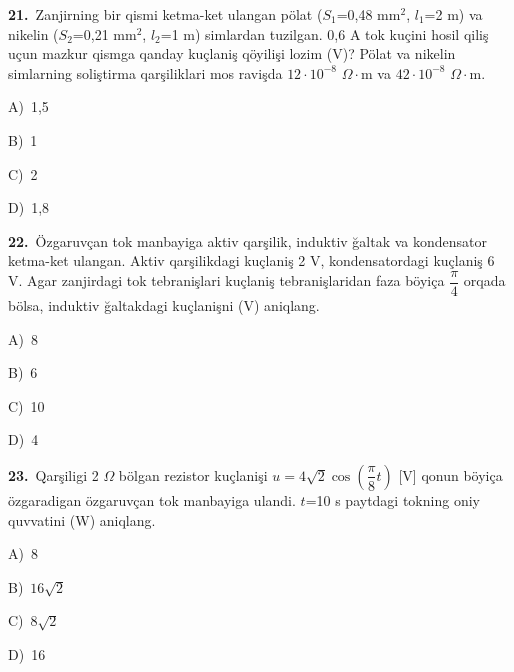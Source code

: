 \documentclass[11pt,a4paper]{article}
\newcommand{\opt}[2]{\hspace*{4mm}#1)\ #2\par}
\begin{document}
\noindent\begin{minipage}{\linewidth}
\textbf{21.}\ Zanjirning bir qismi ketma-ket ulangan pölat ($S_1$=0,48 mm$^{2}$, $l_1$=2 m) va nikelin ($S_2$=0,21 mm$^{2}$, $l_2$=1 m) simlardan tuzilgan. 0,6 A tok kuçini hosil qiliş uçun mazkur qismga qanday kuçlaniş qöyilişi lozim (V)? Pölat va nikelin simlarning soliştirma qarşiliklari mos ravişda $12\cdot10^{-8}$ $\Omega\cdot$m va $42\cdot10^{-8}$ $\Omega\cdot$m.\par\smallskip
\opt{A}{1,5}
\opt{B}{1}
\opt{C}{2}
\opt{D}{1,8}
\end{minipage}\vspace{9pt}\par
\noindent\begin{minipage}{\linewidth}
\textbf{22.}\ Özgaruvçan tok manbayiga aktiv qarşilik, induktiv ğaltak va kondensator ketma-ket ulangan. Aktiv qarşilikdagi kuçlaniş 2 V, kondensatordagi kuçlaniş 6 V. Agar zanjirdagi tok tebranişlari kuçlaniş tebranişlaridan faza böyiça $\dfrac{\pi}{4}$ orqada bölsa, induktiv ğaltakdagi kuçlanişni (V) aniqlang.\par\smallskip
\opt{A}{8}
\opt{B}{6}
\opt{C}{10}
\opt{D}{4}
\end{minipage}\vspace{9pt}\par
\noindent\begin{minipage}{\linewidth}
\textbf{23.}\ Qarşiligi 2 $\Omega$ bölgan rezistor kuçlanişi $u = 4\sqrt{2}\cos(\dfrac{\pi}{8}t)$ [V] qonun böyiça özgaradigan özgaruvçan tok manbayiga ulandi. $t$=10 s paytdagi tokning oniy quvvatini (W) aniqlang.\par\smallskip
\opt{A}{8}
\opt{B}{$16\sqrt{2}$}
\opt{C}{$8\sqrt{2}$}
\opt{D}{16}
\end{minipage}\vspace{9pt}\par
\end{document}
